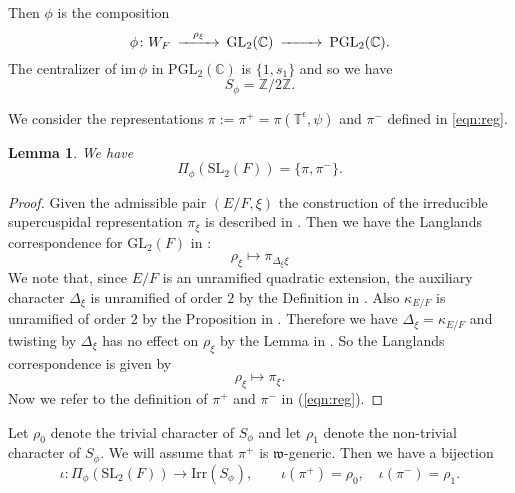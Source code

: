 \documentclass[11pt]{amsart}
\numberwithin{equation}{section}
\newtheorem{lem}[equation]{Lemma}
\def\Irr{\mathrm{Irr}}
\def\fw{\mathfrak{w}}
\def\Ad{\mathrm{Ad}}
\def\Gal{\mathrm{Gal}}
\def\im{\mathrm{im}}
\def\Ind{\mathrm{Ind}}
\def\PGL{\mathrm{PGL}}
\def\GL{\mathrm{GL}}
\def\C{\mathbb{C}}
\def\Z{\mathbb{Z}}
\def\SL{\mathrm{SL}}
\def\im{\mathrm{im}}
\def\bbT{\mathbb{T}}
\def\W{\mathbf{W}}
\newcommand{\<}{\left\langle}
\renewcommand{\>}{\right\rangle}
\begin{document}
Then  $\phi$  is  the composition
\begin{equation}\label{CD2}
\begin{CD}
\phi \colon W_F @>\rho_\xi >> \GL_2(\C) @ >>> \PGL_2(\C).
\end{CD}
\end{equation}  
The centralizer of $\im \, \phi$ in $\PGL_2(\C)$ is $\{1, s_1\}$ and so we have
\[
S_\phi = \Z/2\Z.
\]




We consider the representations $\pi:=\pi^+=\pi(\bbT^\epsilon,\psi)$ and $\pi^-$ defined in \eqref{eqn:reg}.

\begin{lem}We have
\[
\Pi_\phi (\SL_2(F))= \{\pi, \pi^-\}.
\]
\end{lem}
\begin{proof}  Given the admissible pair $(E/F, \xi)$ the construction of the irreducible supercuspidal representation $\pi_\xi$ is described 
in \cite[19.2]{BH}.   Then we have the Langlands correspondence for $\GL_2(F)$ in \cite[34.4]{BH}:
\[
\rho_\xi \mapsto \pi_{\Delta_{\xi}\xi}
\]
We note that, since $E/F$ is an unramified quadratic extension, the auxiliary character $\Delta_\xi$ is unramified of order $2$ by the Definition in 
\cite[34.4]{BH}. 
Also $\kappa_{E/F}$ is unramified of order $2$ by the Proposition in \cite[34.3]{BH}.  Therefore we have  $\Delta_\xi = \kappa_{E/F}$ and twisting by $\Delta_\xi$ has no effect on $\rho_\xi$ by the Lemma in \cite[34.1]{BH}.  So the Langlands correspondence is given by
\[
\rho_\xi \mapsto \pi_\xi.
\]
Now we refer to the definition of $\pi^+$ and $\pi^-$ in (\ref{eqn:reg}).  
\end{proof}  
Let  $\rho_0$ denote the trivial character of $S_\phi$ and let $\rho_1$ denote the non-trivial character of $S_\phi$.   
We will assume that $\pi^+$ is $\fw$-generic.   Then we have a bijection
\[
\iota \colon\Pi_\phi(\SL_2(F)) \to \Irr(S_\phi), \quad \quad  \iota(\pi^+) = \rho_0, \quad \iota(\pi^-) = \rho_1.
\]
\end{document}
